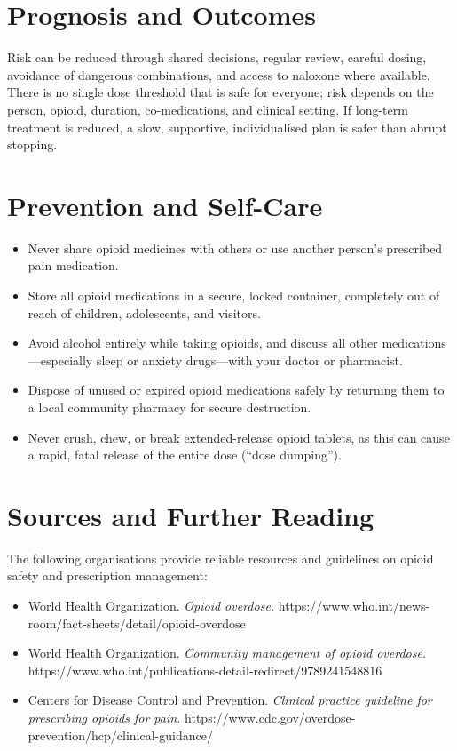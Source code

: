 \section*{Prognosis and Outcomes}
Risk can be reduced through shared decisions, regular review, careful dosing, avoidance of dangerous combinations, and access to naloxone where available. There is no single dose threshold that is safe for everyone; risk depends on the person, opioid, duration, co-medications, and clinical setting. If long-term treatment is reduced, a slow, supportive, individualised plan is safer than abrupt stopping.

\section*{Prevention and Self-Care}
\begin{itemize}
    \item Never share opioid medicines with others or use another person's prescribed pain medication.
    \item Store all opioid medications in a secure, locked container, completely out of reach of children, adolescents, and visitors.
    \item Avoid alcohol entirely while taking opioids, and discuss all other medications—especially sleep or anxiety drugs—with your doctor or pharmacist.
    \item Dispose of unused or expired opioid medications safely by returning them to a local community pharmacy for secure destruction.
    \item Never crush, chew, or break extended-release opioid tablets, as this can cause a rapid, fatal release of the entire dose (``dose dumping'').
\end{itemize}

\section*{Sources and Further Reading}
The following organisations provide reliable resources and guidelines on opioid safety and prescription management:
\begin{itemize}
    \item World Health Organization. \textit{Opioid overdose.} https://www.who.int/news-room/fact-sheets/detail/opioid-overdose
    \item World Health Organization. \textit{Community management of opioid overdose.} https://www.who.int/publications-detail-redirect/9789241548816
    \item Centers for Disease Control and Prevention. \textit{Clinical practice guideline for prescribing opioids for pain.} https://www.cdc.gov/overdose-prevention/hcp/clinical-guidance/
\end{itemize}
